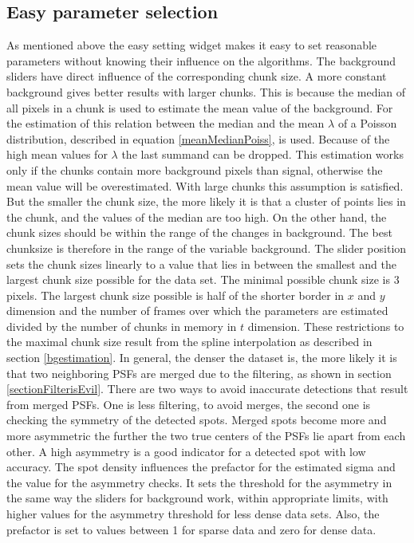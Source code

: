 \subsection{Easy parameter selection}\label{easyParam}
As mentioned above the easy setting widget makes it easy to set reasonable parameters without knowing their influence on the algorithms.\newline
The background sliders have direct influence of the corresponding chunk size. A more constant background gives better results with larger chunks. This is because the median of all pixels in a chunk is used to estimate the mean value of the background. For the estimation of this relation between the median and the mean $\lambda$ of a Poisson distribution, described in equation \ref{meanMedianPoiss}, is used.
Because of the high mean values for $\lambda$ the last summand can be dropped.
This estimation works only if the chunks contain more background pixels than signal, otherwise the mean value will be overestimated. With large chunks this assumption is satisfied. But the smaller the chunk size, the more likely it is that a cluster of points lies in the chunk, and the values of the median are too high. On the other hand, the chunk sizes should be within the range of the changes in background. The best chunksize is therefore in the range of the variable background. The slider position sets the chunk sizes linearly to a value that lies in between the smallest and the largest chunk size possible for the data set.\newline
The minimal possible chunk size is 3 pixels. The largest chunk size possible is half of the shorter border in $x$ and $y$ dimension and the number of frames over which the parameters are estimated divided by the number of chunks in memory in $t$ dimension. These restrictions to the maximal chunk size result from the spline interpolation as described in section \ref{bgestimation}.\newline 
In general, the denser the dataset is, the more likely it is that two neighboring PSFs are merged due to the filtering, as shown in section \ref{sectionFilterisEvil}. There are two ways to avoid inaccurate detections that result from merged PSFs. One is less filtering, to avoid merges, the second one is checking the symmetry of the detected spots. Merged spots become more and more asymmetric the further the two true centers of the PSFs lie apart from each other. A high asymmetry is a good indicator for a detected spot with low accuracy.
The spot density influences the prefactor for the estimated sigma and the value for the asymmetry checks. It sets the threshold for the asymmetry in the same way the sliders for background work, within appropriate limits, with higher values for the asymmetry threshold for less dense data sets. Also, the prefactor is set to values between 1 for sparse data and zero for dense data.